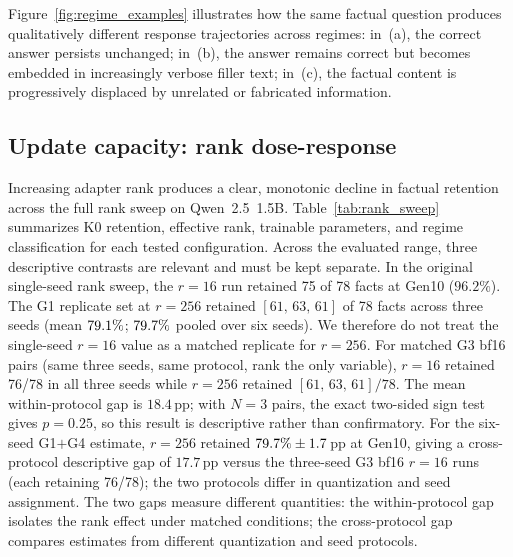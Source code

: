 \documentclass[a4paper,fleqn]{cas-dc}
\newif\ifshowchanges
\newcommand{\rev}[1]{\ifshowchanges{\color{blue}#1}\else{#1}\fi}
\begin{document}
Figure~\ref{fig:regime_examples} illustrates how the same factual question
produces qualitatively different response trajectories across regimes: in~(a),
the correct answer persists unchanged; in~(b), the answer remains correct but
becomes embedded in increasingly verbose filler text; in~(c), the factual
content is progressively displaced by unrelated or fabricated information.

\subsection{Update capacity: rank dose-response}\label{sec:res_capacity}

Increasing adapter rank produces a clear, monotonic decline in factual retention
across the full rank sweep on Qwen~2.5~1.5B.
Table~\ref{tab:rank_sweep} summarizes K0 retention, effective rank, trainable
parameters, and regime classification for each tested configuration. Across the evaluated range, three descriptive contrasts are relevant and must be kept separate.
\rev{In the original single-seed rank sweep, the $r=16$ run retained 75 of 78
facts at Gen10 ($96.2\%$). The G1 replicate set at $r=256$ retained
$[61,\,63,\,61]$ of 78 facts across three seeds (mean $\rev{\GoneMten\%}$; $\rev{\GoneFourMten\%}$ pooled over six seeds). We therefore do not treat the single-seed $r=16$ value as a matched
replicate for $r=256$.}
\rev{For matched G3 bf16 pairs (same three seeds, same protocol, rank the only
variable), $r=16$ retained 76/78 in all three seeds while $r=256$ retained
$[61,\,63,\,61]/78$. The mean within-protocol gap is $18.4$\,pp; with $N{=}3$
pairs, the exact two-sided sign test gives $p{=}0.25$, so this result is
descriptive rather than confirmatory.}
\rev{For the six-seed G1$+$G4 estimate, $r=256$ retained
$79.7\%\pm1.7$\,pp at Gen10, giving a cross-protocol
descriptive gap of $17.7$\,pp versus the three-seed G3 bf16 $r=16$ runs (each retaining 76/78); the two
protocols differ in quantization and seed assignment. \rev{The two gaps measure different quantities: the within-protocol gap isolates the rank effect under matched conditions; the cross-protocol gap compares estimates from different quantization and seed protocols.}}
\end{document}
